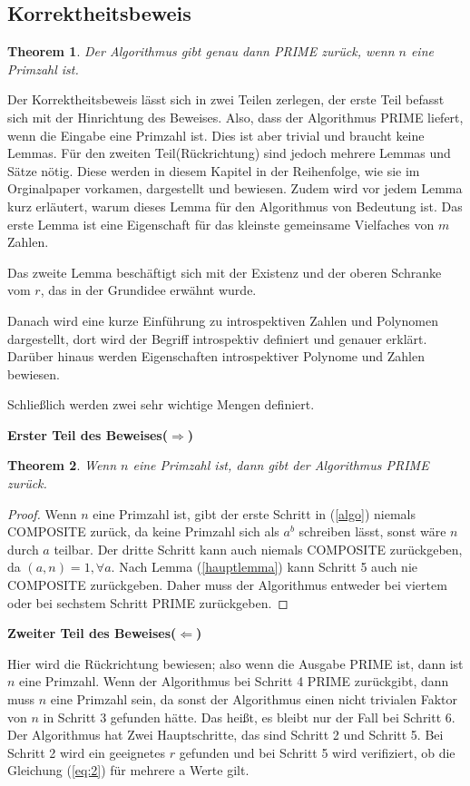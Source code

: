 \documentclass[12pt,oneside]{article}
\newtheorem{theorem}{Theorem}[section]
\theoremstyle{remark}
\theoremstyle{definition}
\begin{document}
\subsection{Korrektheitsbeweis}

\begin{theorem}
Der Algorithmus gibt genau dann PRIME zurück, wenn $n$ eine Primzahl ist.
\end{theorem}
Der Korrektheitsbeweis lässt sich in zwei Teilen zerlegen, der erste Teil befasst sich mit der Hinrichtung des Beweises. Also, dass der Algorithmus PRIME liefert, wenn die Eingabe eine Primzahl ist. Dies ist aber trivial und braucht keine Lemmas. Für den zweiten Teil(Rückrichtung) sind jedoch mehrere Lemmas und Sätze nötig. Diese werden in diesem Kapitel in der Reihenfolge, wie sie im Orginalpaper vorkamen, dargestellt und bewiesen. Zudem wird vor jedem Lemma kurz erläutert, warum dieses Lemma für den Algorithmus von Bedeutung ist. Das erste Lemma ist eine Eigenschaft für das kleinste gemeinsame Vielfaches von $m$ Zahlen.

Das zweite Lemma beschäftigt sich mit der Existenz und der oberen Schranke vom $r$, das in der Grundidee erwähnt wurde.

Danach wird eine kurze Einführung zu introspektiven Zahlen und Polynomen dargestellt, dort wird der Begriff introspektiv definiert und genauer erklärt. Darüber hinaus werden Eigenschaften introspektiver Polynome und Zahlen bewiesen.

Schließlich werden zwei sehr wichtige Mengen definiert.%

\textbf{Erster Teil des Beweises($\Rightarrow$)}
\begin{theorem}
Wenn $n$ eine Primzahl ist, dann gibt der Algorithmus PRIME zurück.
\end{theorem}

\begin{proof}
Wenn $n$ eine Primzahl ist, gibt der erste Schritt in (\ref{algo}) niemals COMPOSITE zurück, da keine Primzahl sich als $a^b$ schreiben lässt, sonst wäre $n$ durch $a$ teilbar. Der dritte Schritt kann auch niemals COMPOSITE zurückgeben, da $(a,n) = 1, \forall a$. Nach Lemma (\ref{hauptlemma}) kann Schritt 5 auch nie COMPOSITE zurückgeben. Daher muss der Algorithmus entweder bei viertem oder bei sechstem Schritt PRIME zurückgeben.  
\end{proof}

\textbf{Zweiter Teil des Beweises($\Leftarrow$)}

Hier wird die Rückrichtung bewiesen; also  wenn die Ausgabe PRIME ist, dann ist $n$ eine Primzahl.
Wenn der Algorithmus bei Schritt 4 PRIME zurückgibt, dann muss $n$ eine Primzahl sein, da sonst der Algorithmus einen nicht trivialen Faktor von $n$ in Schritt 3 gefunden hätte. Das heißt, es bleibt nur der Fall bei Schritt 6. Der Algorithmus hat Zwei Hauptschritte, das sind Schritt 2 und Schritt 5. Bei Schritt 2 wird ein geeignetes $r$ gefunden und bei Schritt 5 wird verifiziert, ob die Gleichung (\ref{eq:2}) für mehrere a Werte gilt.    
\end{document}
